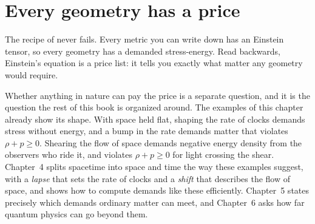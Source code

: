 \section{Every geometry has a price}\label{sec:price}

The recipe of  never fails. Every metric you can write
down has an Einstein tensor, so every geometry has a demanded stress-energy.
Read backwards, Einstein's equation is a price list: it tells you exactly what
matter any geometry would require.

Whether anything in nature can pay the price is a separate question, and it is
the question the rest of this book is organized around. The examples of this
chapter already show its shape. With space held flat, shaping the rate of
clocks demands stress without energy, and a bump in the rate demands matter
that violates $\rho + p \ge 0$. Shearing the flow of space demands negative
energy density from the observers who ride it, and violates $\rho + p \ge 0$
for light crossing the shear. Chapter~4 splits spacetime
into space and time the way these examples suggest, with a \emph{lapse} that
sets the rate of clocks and a \emph{shift} that describes the flow of space, and
shows how to compute demands like these efficiently. Chapter~5 states precisely
which demands ordinary matter can meet, and Chapter~6 asks how far quantum
physics can go beyond them.

